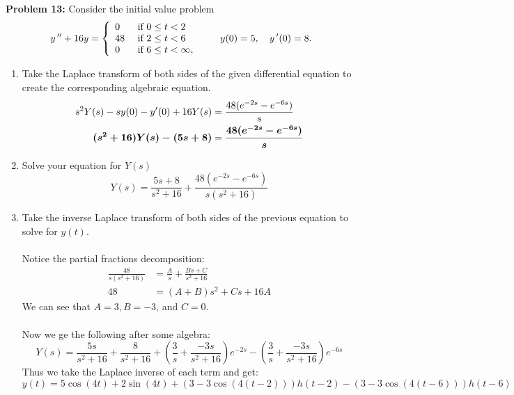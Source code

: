 \documentclass[12pt]{article}
\begin{document}
\newpage

\noindent \textbf{Problem 13: }Consider the initial value problem
	$$
	y\,'' + 16 y = \left\lbrace \begin{array}{ l l } 0 & \mbox{ if } 0\leq t < 2 \\ 48 & \mbox{ if } 2 \leq t < 6 \\ 0 & \mbox{ if } 6 \leq t < \infty, \end{array} \right. \quad \quad y(0) = 5, \quad y\,'(0) = 8.
	$$
	\begin{enumerate}[label = (\alph*)]
		\item Take the Laplace transform of both sides of the given differential equation to create the corresponding algebraic equation.
			\begin{align*}
				s^2Y(s) - sy(0) - y'(0) + 16Y(s) &= \frac{48(e^{-2s} - e^{-6s})}{s} \\
				\text{\boldmath $(s^2 + 16)Y(s) - (5s + 8)$} &= \text{\boldmath $\frac{48(e^{-2s} - e^{-6s})}{s}$}
			\end{align*}
		\item Solve your equation for $Y(s)$
			\boldmath
			$$
			Y(s) = \frac{5s + 8}{s^2 + 16} + \frac{48(e^{-2s} - e^{-6s})}{s(s^2 + 16)}
			$$
			\unboldmath
		\item Take the inverse Laplace transform of both sides of the previous equation to solve for $y(t)$.
		\\ \\
		Notice the partial fractions decomposition:
			\begin{align*}
				\frac{48}{s(s^2 + 16)} &= \frac{A}{s} + \frac{Bs + C}{s^2 + 16} \\
				48 &= (A+B)s^2 + Cs + 16A 
			\end{align*}
		We can see that $A = 3, B = -3$, and $C = 0$.
		\\ \\
		Now we ge the following after some algebra:
			$$
			Y(s) = \frac{5s}{s^2 + 16} + \frac{8}{s^2 + 16} + \left(\frac{3}{s} + \frac{-3s}{s^2 + 16}\right)e^{-2s} - \left(\frac{3}{s} + \frac{-3s}{s^2 + 16}\right)e^{-6s}
			$$
		Thus we take the Laplace inverse of each term and get:
			\boldmath
			$$
			y(t) = 5\cos(4t) + 2\sin(4t) + (3  -3\cos(4(t-2)))h(t-2) - (3 - 3\cos(4(t-6)))h(t-6)
			$$
			\unboldmath
	\end{enumerate}

\newpage
\end{document}
